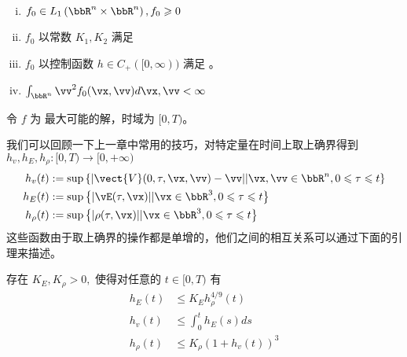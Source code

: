 \begin{assumption}
    
  \begin{enumerate}[(i)]
    \item $f_0 \in L_{1}\left(\bbR^{n} \times \bbR^{n}\right), f_0 \geqslant 0$
    \item  $f_0$ 以常数  $K_1, K_2$  满足 \supremumf
    \item  $f_0$ 以控制函数 $h\in C_+([0,\infty))$ 满足 \lipOffVsphere。 
    \item $\int_{\bbR^{n}} \vv^{2} f_0(\vx, \vv) d \vx, \vv<\infty$
  \end{enumerate}
\end{assumption}

令 $f$ 为 \eqvp 最大可能的解，时域为 $[0, T)$。 





\begin{definition}
  我们可以回顾一下上一章中常用的技巧，对特定量在时间上取上确界得到 $h_{v}, h_{E}, h_{\rho}:[0, T)\rightarrow [0,+\infty)$ 
\[
\begin{aligned}
h_{v}(t) &:=\sup \left\{|\vect{V}(0, \tau, \vx, \vv)-\vv| | \vx, \vv \in \bbR^{n}, 0 \leqslant \tau \leqslant t\right\} \\
h_{E}(t) &:=\sup \left\{|\vE(\tau, \vx)| | \vx \in \bbR^{3}, 0 \leqslant \tau \leqslant t\right\} \\
h_{\rho}(t) &:=\sup \left\{|\rho(\tau, \vx)| | \vx \in \bbR^{3}, 0 \leqslant \tau \leqslant t\right\}
\end{aligned}
\]
这些函数由于取上确界的操作都是单增的，他们之间的相互关系可以通过下面的引理来描述。 
\end{definition}

\begin{lemma}
  存在 $K_{E}, K_{\rho}>0,$ 使得对任意的 $t \in[0, T)$ 有
\[
\begin{aligned}
h_{E}(t) & \leqslant K_{ E} h_{\rho}^{4 / 9}(t) \\
h_{v}(t) & \leqslant \int_{0}^{t} h_{E}(s) d s \\
h_{\rho}(t) & \leqslant K_{ \rho}\left(1+h_{v}(t)\right)^{3}
\end{aligned}
\]
\end{lemma}

